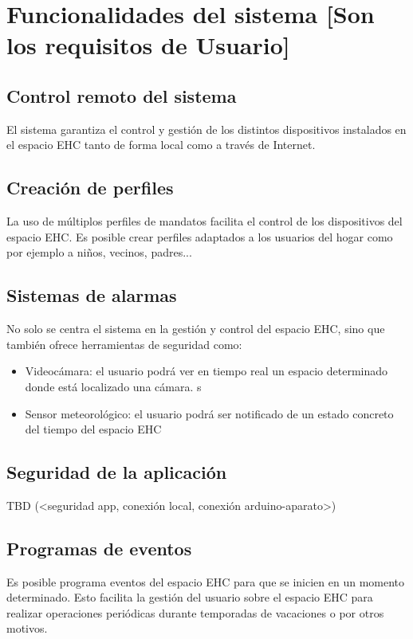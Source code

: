 \chapter{Funcionalidades del sistema [Son los requisitos de Usuario]}

\section{Control remoto del sistema}
    El sistema garantiza el control y gestión de los distintos dispositivos instalados en el espacio EHC tanto de forma local como a través de Internet.

\section{Creación de perfiles}
    La uso de múltiplos perfiles de mandatos facilita el control de los dispositivos del espacio EHC. Es posible crear perfiles adaptados a los usuarios del hogar como por ejemplo  a niños, vecinos, padres...

\section{Sistemas de alarmas}
    No solo se centra el sistema en la gestión y control del espacio EHC, sino que también ofrece herramientas de seguridad como:
    \begin{itemize}
        \item Videocámara: el usuario podrá ver en tiempo real un espacio determinado donde está localizado una cámara. s
        \item Sensor meteorológico: el usuario podrá ser notificado de un estado concreto del tiempo del espacio EHC
    \end{itemize}

\section{Seguridad de la aplicación}
    TBD (<seguridad app, conexión local, conexión arduino-aparato>)

\section{Programas de eventos}
    Es posible programa eventos del espacio EHC para que se inicien en un momento determinado. Esto facilita la gestión del usuario sobre el espacio EHC para realizar operaciones periódicas durante temporadas de vacaciones o por otros motivos.
